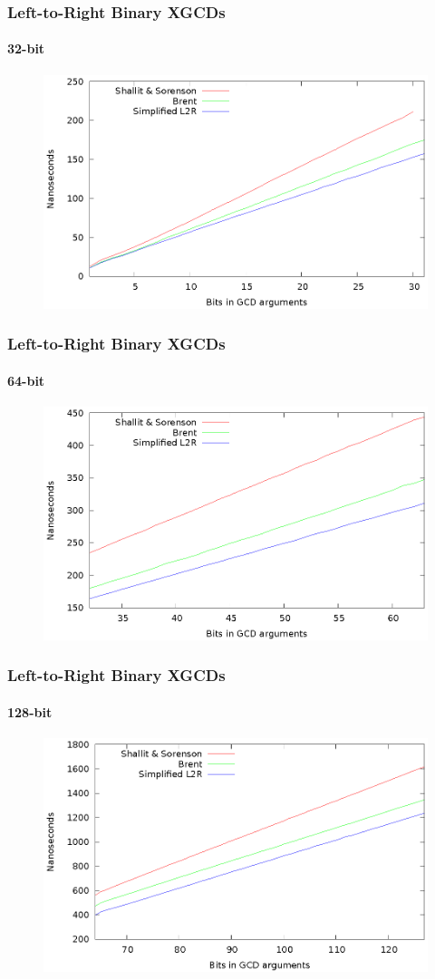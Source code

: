 \documentclass{beamer}
\begin{document}
\begin{frame}
\frametitle{Left-to-Right Binary XGCDs}
\framesubtitle{32-bit}
\begin{figure}
\includegraphics[scale=0.86]{xgcds-binary-32}
\end{figure}
\end{frame}
\begin{frame}
\frametitle{Left-to-Right Binary XGCDs}
\framesubtitle{64-bit}
\begin{figure}
\includegraphics[scale=0.86]{xgcds-binary-64}
\end{figure}
\end{frame}
\begin{frame}
\frametitle{Left-to-Right Binary XGCDs}
\framesubtitle{128-bit}
\begin{figure}
\includegraphics[scale=0.86]{xgcds-binary-128}
\end{figure}
\end{frame}
\end{document}
